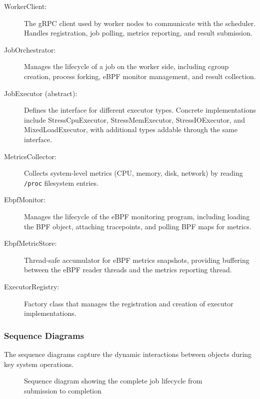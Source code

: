 \begin{description}
	\item[WorkerClient:] The gRPC client used by worker nodes to communicate with the scheduler. Handles registration, job polling, metrics reporting, and result submission.

	\item[JobOrchestrator:] Manages the lifecycle of a job on the worker side, including cgroup creation, process forking, eBPF monitor management, and result collection.

	\item[JobExecutor (abstract):] Defines the interface for different executor types. Concrete implementations include StressCpuExecutor, StressMemExecutor, StressIOExecutor, and MixedLoadExecutor, with additional types addable through the same interface.

	\item[MetricsCollector:] Collects system-level metrics (CPU, memory, disk, network) by reading \texttt{/proc} filesystem entries.

	\item[EbpfMonitor:] Manages the lifecycle of the eBPF monitoring program, including loading the BPF object, attaching tracepoints, and polling BPF maps for metrics.

	\item[EbpfMetricStore:] Thread-safe accumulator for eBPF metrics snapshots, providing buffering between the eBPF reader threads and the metrics reporting thread.

	\item[ExecutorRegistry:] Factory class that manages the registration and creation of executor implementations.
\end{description}

\subsubsection{Sequence Diagrams}

The sequence diagrams capture the dynamic interactions between objects during key system operations.

\begin{figure}[htbp]
	\centering
	\caption{Sequence diagram showing the complete job lifecycle from submission to completion}
	\label{fig:sequence-job-lifecycle}
\end{figure}

